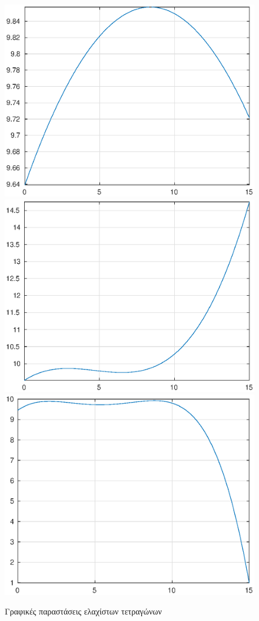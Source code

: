 \documentclass[12pt,a4paper]{article}
\begin{document}
\begin{figure}[H]
    \centering
        \includegraphics[width=.3\textwidth]{resources/opap2.eps}
        \includegraphics[width=.3\textwidth]{resources/opap3.eps}
        \includegraphics[width=.3\textwidth]{resources/opap4.eps}

        \caption{Γραφικές παραστάσεις ελαχίστων τετραγώνων}
        \label{fig:leastSquareComparison}
\end{figure}
\end{document}

